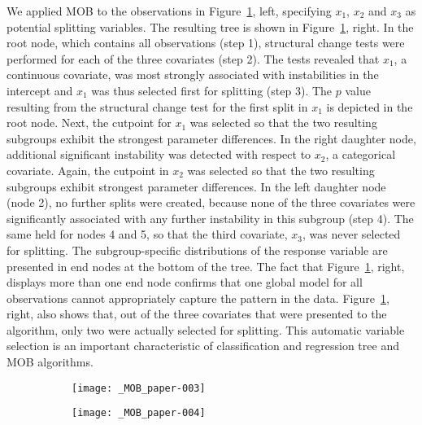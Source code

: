 \documentclass[doc,floatsintext,natbib]{apa7}
\begin{document}
We applied MOB to the observations in Figure~\ref{fig:toy}, left, specifying $x_1$, $x_2$ and $x_3$ as potential splitting variables. The resulting tree is shown in Figure~\ref{fig:toy}, right. In the root node, which contains all observations (step 1), structural change tests were performed for each of the three covariates (step 2). The tests revealed that $x_1$, a continuous covariate, was most strongly associated with instabilities in the intercept and $x_1$ was thus selected first for splitting (step 3). The $p$ value resulting from the structural change test for the first split in $x_1$ is depicted in the root node. Next, the cutpoint for $x_1$ was selected so that the two resulting subgroups exhibit the strongest parameter differences. In the right daughter node, additional significant instability was detected with respect to $x_2$, a categorical covariate. Again, the cutpoint in $x_2$ was selected so that the two resulting subgroups exhibit strongest parameter differences. In the left daughter node (node 2), no further splits were created, because none of the three covariates were significantly associated with any further instability in this subgroup (step 4). The same held for nodes 4 and 5, so that the third covariate, $x_3$, was never selected for splitting. The subgroup-specific distributions of the response variable are presented in end nodes at the bottom of the tree.
The fact that Figure~\ref{fig:toy}, right, displays more than one end node confirms that one global model for all observations cannot appropriately capture the pattern in the data. 
Figure~\ref{fig:toy}, right, also shows that, out of the three covariates that were presented to the algorithm, only two were actually selected for splitting. This automatic variable selection is an important characteristic of classification and regression tree and MOB algorithms. 

\begin{figure}
\caption{Left: Univariate distribution of the response variable, with global mean indicated by triangle. Right: Tree with group-specific distributions of the response variable in the terminal nodes.}
\begin{subfigure}[][][t]{.4\textwidth}
\texttt{[image: \_MOB\_paper-003]}
\end{subfigure}
\begin{subfigure}[][][b]{.6\textwidth}
\texttt{[image: \_MOB\_paper-004]}
\end{subfigure}
\label{fig:toy}
\end{figure}
\end{document}
